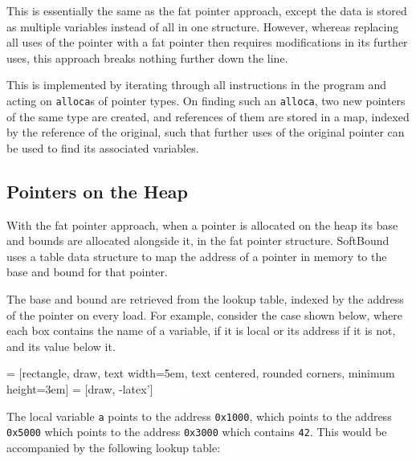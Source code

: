 This is essentially the same as the fat pointer approach, except the data is stored as multiple variables instead of all in one structure.
However, whereas replacing all uses of the pointer with a fat pointer then requires modifications in its further uses, this approach breaks nothing further down the line.

This is implemented by iterating through all instructions in the program and acting on \verb!alloca!s of pointer types.
On finding such an \verb!alloca!, two new pointers of the same type are created, and references of them are stored in a map, indexed by the reference of the original, such that further uses of the original pointer can be used to find its associated variables.

\subsection{Pointers on the Heap}

With the fat pointer approach, when a pointer is allocated on the heap its base and bounds are allocated alongside it, in the fat pointer structure.
SoftBound uses a table data structure to map the address of a pointer in memory to the base and bound for that pointer.

The base and bound are retrieved from the lookup table, indexed by the address of the pointer on every load.
For example, consider the case shown below, where each box contains the name of a variable, if it is local or its address if it is not, and its value below it. 

\noindent
{} = [rectangle, draw, 
    text width=5em, text centered, rounded corners, minimum height=3em]
 = [draw, -latex']

The local variable \verb!a! points to the address \verb!0x1000!, which points to the address \verb!0x5000! which points to the address \verb!0x3000! which contains \verb!42!. This would be accompanied by the following lookup table:

